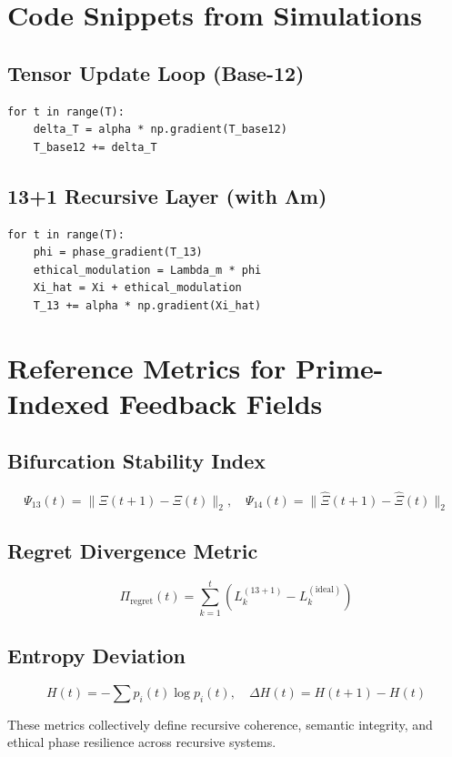 \documentclass[12pt]{article}
\begin{document}
\section{Code Snippets from Simulations}

\subsection*{Tensor Update Loop (Base-12)}
\begin{verbatim}
for t in range(T):
    delta_T = alpha * np.gradient(T_base12)
    T_base12 += delta_T
\end{verbatim}

\subsection*{13+1 Recursive Layer (with Λm)}
\begin{verbatim}
for t in range(T):
    phi = phase_gradient(T_13)
    ethical_modulation = Lambda_m * phi
    Xi_hat = Xi + ethical_modulation
    T_13 += alpha * np.gradient(Xi_hat)
\end{verbatim}

\section{Reference Metrics for Prime-Indexed Feedback Fields}

\subsection*{Bifurcation Stability Index}
\[
\Psi_{13}(t) = \| \Xi(t+1) - \Xi(t) \|_2, \quad 
\Psi_{14}(t) = \| \hat{\Xi}(t+1) - \hat{\Xi}(t) \|_2
\]

\subsection*{Regret Divergence Metric}
\[
\Pi_{\text{regret}}(t) = \sum_{k=1}^{t} (L^{(13+1)}_k - L^{(\text{ideal})}_k)
\]

\subsection*{Entropy Deviation}
\[
H(t) = -\sum p_i(t) \log p_i(t), \quad 
\Delta H(t) = H(t+1) - H(t)
\]

These metrics collectively define recursive coherence, semantic integrity, and ethical phase resilience across recursive systems.

\nocite{*}


\end{document}
